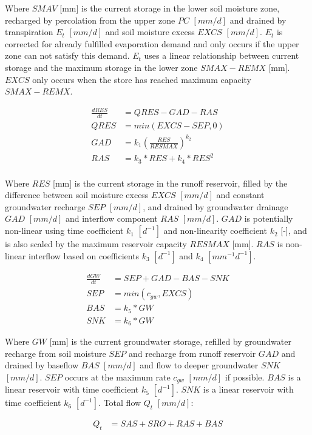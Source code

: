 Where $SMAV$ [mm] is the current storage in the lower soil moisture zone, recharged by percolation from the upper zone $PC$ $[mm/d]$ and drained by transpiration $E_t$ $[mm/d]$ and soil moisture excess $EXCS$ $[mm/d]$.
$E_t$ is corrected for already fulfilled evaporation demand and only occurs if the upper zone can not satisfy this demand. 
$E_t$ uses a linear relationship between current storage and the maximum storage in the lower zone $SMAX-REMX$ [mm].
$EXCS$ only occurs when the store has reached maximum capacity $SMAX-REMX$.

\begin{align}
	\frac{dRES}{dt} &= QRES-GAD-RAS\\
	QRES &= min(EXCS-SEP,0) \\
	GAD &= k_1\left(\frac{RES}{RESMAX}\right)^{k_2}\\
	RAS &= k_3*RES+k_4*RES^2\\
\end{align}

Where $RES$ [mm] is the current storage in the runoff reservoir, filled by the difference between soil moisture excess $EXCS$  $[mm/d]$ and constant groundwater recharge $SEP$  $[mm/d]$, and drained by groundwater drainage $GAD$  $[mm/d]$ and interflow component $RAS$  $[mm/d]$. 
$GAD$ is potentially non-linear using time coefficient $k_1$ $[d^{-1}]$ and non-linearity coefficient $k_2$ [-], and is also scaled by the maximum reservoir capacity $RESMAX$ [mm]. 
$RAS$ is non-linear interflow based on coefficients $k_3$ $[d^{-1}]$ and $k_4$ $[mm^{-1}d^{-1}]$.

\begin{align}
	\frac{dGW}{dt} &= SEP+GAD-BAS-SNK\\
	SEP &= min(c_{gw},EXCS) \\
	BAS &= k_5*GW\\
	SNK &= k_6*GW
\end{align}

Where $GW$ [mm] is the current groundwater storage, refilled by groundwater recharge from soil moisture $SEP$ and recharge from runoff reservoir $GAD$ and drained by baseflow $BAS$  $[mm/d]$ and flow to deeper groundwater $SNK$  $[mm/d]$.
$SEP$ occurs at the maximum rate $c_{gw}$ $[mm/d]$ if possible.
$BAS$ is a linear reservoir with time coefficient $k_5$  $[d^{-1}]$.
$SNK$ is a linear reservoir with time coefficient $k_6$ $[d^{-1}]$.
Total flow $Q_t$  $[mm/d]$:

\begin{align}
	Q_t &= SAS+SRO+RAS+BAS
\end{align}

